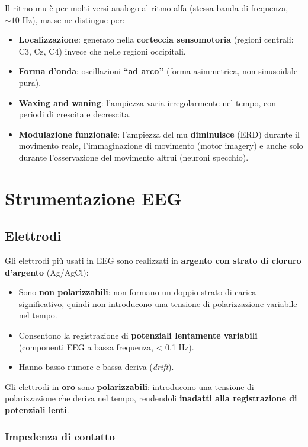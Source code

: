 Il ritmo mu è per molti versi analogo al ritmo alfa (stessa banda di frequenza, $\sim 10$ Hz), ma se ne distingue per:
\begin{itemize}
    \item \textbf{Localizzazione}: generato nella \textbf{corteccia sensomotoria} (regioni centrali: C3, Cz, C4) invece che nelle regioni occipitali.
    \item \textbf{Forma d'onda}: oscillazioni \textbf{``ad arco''} (forma asimmetrica, non sinusoidale pura).
    \item \textbf{Waxing and waning}: l'ampiezza varia irregolarmente nel tempo, con periodi di crescita e decrescita.
    \item \textbf{Modulazione funzionale}: l'ampiezza del mu \textbf{diminuisce} (ERD) durante il movimento reale, l'immaginazione di movimento (motor imagery) e anche solo durante l'osservazione del movimento altrui (neuroni specchio).
\end{itemize}

\section{Strumentazione EEG}

\subsection{Elettrodi}

Gli elettrodi più usati in EEG sono realizzati in \textbf{argento con strato di cloruro d'argento} (Ag/AgCl):
\begin{itemize}
    \item Sono \textbf{non polarizzabili}: non formano un doppio strato di carica significativo, quindi non introducono una tensione di polarizzazione variabile nel tempo.
    \item Consentono la registrazione di \textbf{potenziali lentamente variabili} (componenti EEG a bassa frequenza, < 0.1 Hz).
    \item Hanno basso rumore e bassa deriva (\textit{drift}).
\end{itemize}

Gli elettrodi in \textbf{oro} sono \textbf{polarizzabili}: introducono una tensione di polarizzazione che deriva nel tempo, rendendoli \textbf{inadatti alla registrazione di potenziali lenti}.

\subsubsection{Impedenza di contatto}

